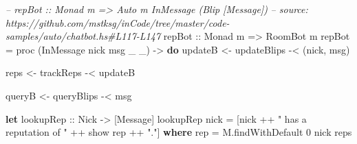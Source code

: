 \documentclass[]{article}
\newenvironment{Shaded}{\begin{snugshade}}{\end{snugshade}}
\newcommand{\CommentTok}[1]{\textcolor[rgb]{0.56,0.35,0.01}{\textit{#1}}}
\newcommand{\DataTypeTok}[1]{\textcolor[rgb]{0.13,0.29,0.53}{#1}}
\newcommand{\DecValTok}[1]{\textcolor[rgb]{0.00,0.00,0.81}{#1}}
\newcommand{\FunctionTok}[1]{\textcolor[rgb]{0.00,0.00,0.00}{#1}}
\newcommand{\KeywordTok}[1]{\textcolor[rgb]{0.13,0.29,0.53}{\textbf{#1}}}
\newcommand{\NormalTok}[1]{#1}
\newcommand{\OtherTok}[1]{\textcolor[rgb]{0.56,0.35,0.01}{#1}}
\newcommand{\StringTok}[1]{\textcolor[rgb]{0.31,0.60,0.02}{#1}}
\begin{document}
\begin{Shaded}
\begin{Highlighting}[]
\CommentTok{-- repBot :: Monad m => Auto m InMessage (Blip [Message])}
\CommentTok{-- source: https://github.com/mstksg/inCode/tree/master/code-samples/auto/chatbot.hs#L117-L147}
\OtherTok{repBot ::} \DataTypeTok{Monad}\NormalTok{ m }\OtherTok{=>} \DataTypeTok{RoomBot}\NormalTok{ m}
\NormalTok{repBot }\FunctionTok{=}\NormalTok{ proc (}\DataTypeTok{InMessage}\NormalTok{ nick msg _ _) }\OtherTok{->} \KeywordTok{do}
\NormalTok{    updateB }\OtherTok{<-}\NormalTok{ updateBlips }\FunctionTok{-<}\NormalTok{ (nick, msg)}

\NormalTok{    reps    }\OtherTok{<-}\NormalTok{ trackReps   }\FunctionTok{-<}\NormalTok{ updateB}

\NormalTok{    queryB  }\OtherTok{<-}\NormalTok{ queryBlips  }\FunctionTok{-<}\NormalTok{ msg}

    \KeywordTok{let}\OtherTok{ lookupRep ::} \DataTypeTok{Nick} \OtherTok{->}\NormalTok{ [}\DataTypeTok{Message}\NormalTok{]}
\NormalTok{        lookupRep nick }\FunctionTok{=}\NormalTok{ [nick }\FunctionTok{++} \StringTok{" has a reputation of "} \FunctionTok{++}\NormalTok{ show rep }\FunctionTok{++} \StringTok{"."}\NormalTok{]}
          \KeywordTok{where}
\NormalTok{            rep }\FunctionTok{=}\NormalTok{ M.findWithDefault }\DecValTok{0}\NormalTok{ nick reps}


\end{Highlighting}
\end{Shaded}
\end{document}

